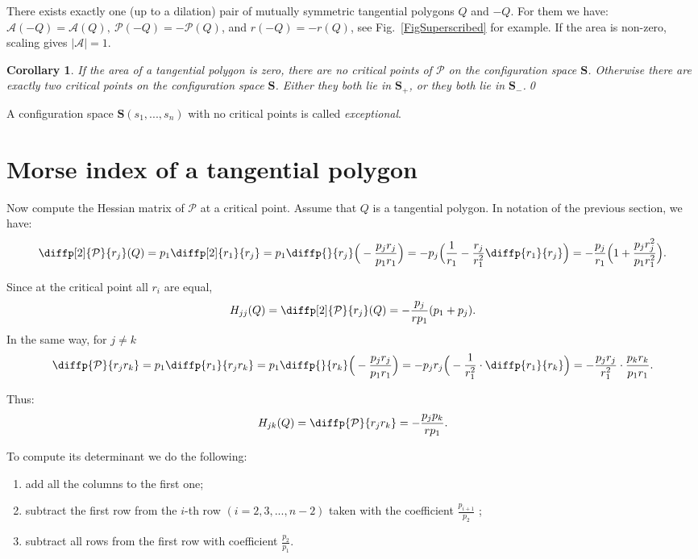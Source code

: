 \documentclass[12pt]{amsart}
\theoremstyle{plain}
\newtheorem{corollary}{Corollary}
\theoremstyle{definition}
\theoremstyle{remark}
\theoremstyle{plain}
\theoremstyle{definition}
\begin{document}
There exists exactly one (up to a dilation) pair of mutually symmetric tangential polygons  $Q$ and $-Q$. For them we have: $\mathcal{A}(-Q)=\mathcal{A}(Q),\  \mathcal{P}(-Q)=-\mathcal{P}(Q)$, and $r(-Q)=-r(Q)$, see Fig.~\ref{FigSuperscribed} for example. If the area is non-zero, scaling gives $|\mathcal{A}|=1$.

\begin{corollary}\label{CorCritPer}
If the area of a tangential polygon is zero, there are no critical points of \(\mathcal{P}\) on the configuration space $\mathbf{S}$.
Otherwise there are exactly two critical points on the configuration space $\mathbf{S}$. Either they both lie in $\mathbf{S}_+$, or they both lie in $\mathbf{S}_-$.\qed

\end{corollary}


\medskip

A configuration space $\mathbf{S}(s_1,...,s_n)$ with no critical points is called\textit{ exceptional}.

\section{Morse index of a tangential polygon}
Now compute the Hessian matrix of $\mathcal{P}$ at a critical point. Assume that $Q$ is a tangential polygon. In notation of the previous section, we have:
\[
\diffp[2]{\mathcal{P}}{{r_j}}(Q)=p_1\diffp[2]{r_1}{{r_j}}=p_1\diffp{}{{r_j}}\Big(-\frac{p_j r_j}{p_1 r_1}\Big)=-p_j\Big(\frac1{r_1}-\frac{r_j}{r_1^2}\diffp{r_1}{{r_j}}\Big)=-\frac{p_j}{r_1}\Big(1+\frac{p_j r_j^2}{p_1 r_1^2}\Big).
\]

Since at the critical point all \(r_i\) are equal,
\[
H_{jj}(Q)=\diffp[2]{\mathcal{P}}{{r_j}}(Q)=-\frac{p_j}{r p_1}(p_1+p_j).
\]
In the same way, for \(j\neq k\)
\[
\diffp{\mathcal{P}}{{r_j}{r_k}}=p_1\diffp{r_1}{{r_j}{r_k}}=p_1\diffp{}{{r_k}}\Big(-\frac{p_j r_j}{p_1 r_1}\Big)=-p_j r_j\Big(-\frac1{r_1^2}\cdot \diffp{r_1}{{r_k}}\Big)=-\frac{p_j r_j}{r_1^2}\cdot \frac{p_k r_k}{p_1 r_1}.
\]

Thus: $$ H_{jk}(Q)=\diffp{\mathcal{P}}{{r_j}{r_k}}=-\frac{p_j p_k}{r p_1}.$$

To compute its determinant we do the following:
\begin{enumerate}
\item add all the columns to the first one;
\item subtract the first row from the \(i\)-th row $(i=2,3,...,n-2)$ taken with the coefficient \(\frac{p_{i+1}}{p_2}\) ;
\item subtract all rows from the first row with coefficient \(\frac{p_2}{p_1}\).
\end{enumerate}
\end{document}
